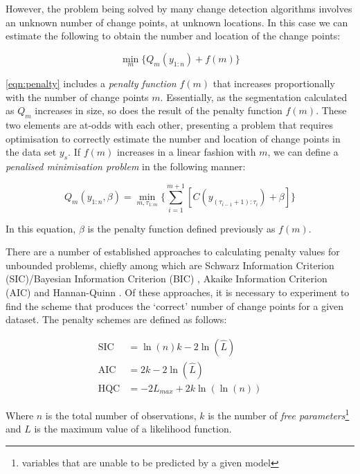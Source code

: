 \documentclass{uvamscse}	%
\begin{document}
However, the problem being solved by many change detection algorithms involves an unknown number of change points, at unknown locations. In this case we can estimate the following to obtain the number and location of the change points:

\begin{equation}
\label{eqn:penalty}
    \min_{m} \big\{ Q_m(y_{1:n}) + f(m) \big\}
\end{equation}

\autoref{eqn:penalty} includes a \emph{penalty function} $f(m)$ that increases proportionally with the number of change points $m$. Essentially, as the segmentation calculated as $Q_m$ increases in size, so does the result of the penalty function $f(m)$. These two elements are at-odds with each other, presenting a problem that requires optimisation to correctly estimate the number and location of change points in the data set $y_s$. If $f(m)$ increases in a linear fashion with $m$, we can define a \emph{penalised minimisation problem} in the following manner:

\begin{equation}
\label{bounded}
    Q_m(y_{1:n}, \beta) = \min_{m,\tau_{1:m}} \Bigg\{ \sum^{m+1}_{i=1}[C(y_{(\tau_{i - 1} + 1):\tau_i}) + \beta] \Bigg\}
\end{equation}

In this equation, $\beta$ is the penalty function defined previously as $f(m)$.

There are a number of established approaches to calculating penalty values for unbounded problems, chiefly among which are Schwarz Information Criterion (SIC)/Bayesian Information Criterion (BIC) \cite{Schwarz1978}, Akaike Information Criterion (AIC) \cite{Akaike1974} and Hannan-Quinn \cite{Journal2009}. Of these approaches, it is necessary to experiment to find the scheme that produces the `correct' number of change points for a given dataset. The penalty schemes are defined as follows:

\begin{align}
    \text{SIC} &= \ln(n) k - 2 \ln(\hat{L})\\
    \text{AIC} &= 2k - 2 \ln(\hat{L})\\
    \text{HQC} &= -2L_{max} + 2k \ln(\ln(n))
\end{align}

Where $n$ is the total number of observations, $k$ is the number of \emph{free parameters}\footnote{variables that are unable to be predicted by a given model} and $\hat{L}$ is the maximum value of a likelihood function.
\end{document}
